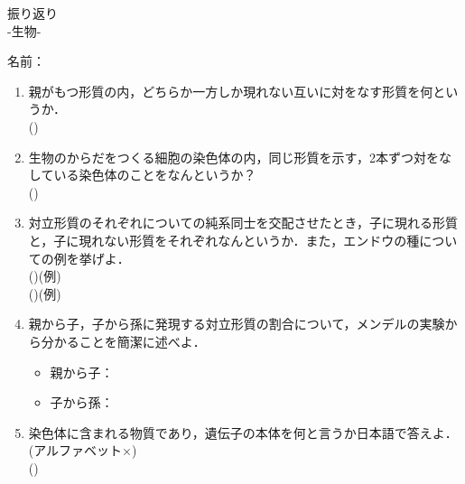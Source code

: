 \documentclass[fontsize=15pt]{jlreq}
\newcommand{\m}[1]{\raisebox{0.1em}{\textcircled{\scriptsize #1}}}
\begin{document}
\begin{center}
{\LARGE {振り返り}} \\
-生物\m{2}- %
\end{center}
\vspace{1em}
\begin{flushright}
名前：\underline{\hspace{5cm}}
\end{flushright}

\begin{enumerate}
    \item 親がもつ形質の内，どちらか一方しか現れない互いに対をなす形質を何というか．\\
    (\hspace{4cm})
    \vspace{2em} 

    \item 生物のからだをつくる細胞の染色体の内，同じ形質を示す，2本ずつ対をなしている染色体のことをなんというか？\\
    (\hspace{4cm})
    \vspace{2em} 

    \item 対立形質のそれぞれについての純系同士を交配させたとき，\m{1}子に現れる形質と，\m{2}子に現れない形質をそれぞれなんというか．また，エンドウの種についての例を挙げよ．\\
    \m{1}(\hspace{3cm})(例\hspace{4cm})\\
    \m{2}(\hspace{3cm})(例\hspace{4cm})
    
    \vspace{2em} 

    \item 親から子，子から孫に発現する対立形質の割合について，メンデルの実験から分かることを簡潔に述べよ．
    \begin{itemize}
        \item 親から子：
        \item 子から孫：
    \end{itemize}
    \vspace{2em} 

    \item 染色体に含まれる物質であり，遺伝子の本体を何と言うか日本語で答えよ．(アルファベット×)\\
    (\hspace{4cm})
    \vspace{2em} 

\end{enumerate}
\end{document}
